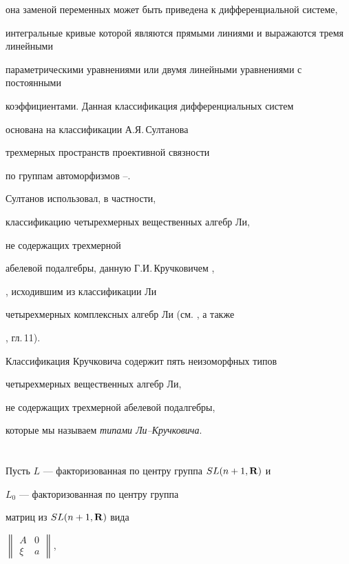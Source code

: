 она заменой переменных может быть приведена к дифференциальной системе, 


интегральные кривые которой являются прямыми линиями и выражаются тремя линейными 


параметрическими уравнениями или двумя линейными уравнениями с постоянными 


коэффициентами. Данная классификация дифференциальных систем


основана на классификации А.Я.\,Султанова 


трехмерных пространств проективной связности


по группам автоморфизмов \cite{Sultanov_74}--\cite{Sultanov_81}.


Султанов использовал, в частности,


классификацию четырехмерных вещественных алгебр Ли,


не содержащих трехмерной


абелевой подалгебры, данную Г.И.\,Кручковичем \cite{Kruch_54},


\cite{Kruch_57}, исходившим из классификации Ли


четырехмерных комплексных алгебр Ли (см. \cite{Petrov_66}, а также


\cite{Amin-Yanus-03}, гл.\,11).


Классификация Кручковича содержит пять неизоморфных типов


четырехмерных вещественных алгебр Ли,


не содержащих трехмерной абелевой подалгебры,


которые мы называем {\it типами Ли--Кручковича}.








\section{}\label{par1}





Пусть $L$ --- факторизованная по центру группа $SL(n+1,{\bold R})$ и


$L_{0}$ --- факторизованная по центру группа


матриц из $SL(n+1,{\bold R})$ вида


$\left\|\begin{smallmatrix}


A & 0 \\ \xi & a \end{smallmatrix}\right\|$,


